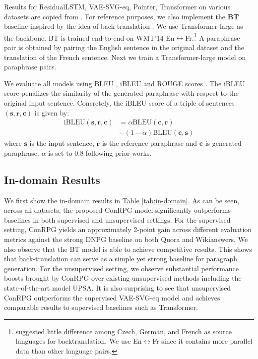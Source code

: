 \documentclass[11pt,a4paper]{article}
\newcommand{\sts}{{{\textsc{Seq2Seq}}}\xspace}
\begin{document}
Results for 
 ResidualLSTM, VAE-SVG-eq, Pointer, Transformer on various datasets are copied from . 
For reference purposes, we also implement the {\bf BT} baseline inspired by the idea of back-translation \citep{sennrich2016back-translation,wieting2017learning}. 
We use Transformer-large as the backbone. BT is trained end-to-end on WMT'14 En$\leftrightarrow$Fr.\footnote{ suggested little difference among Czech,
German, and French as source languages for backtranslation. We use En$\leftrightarrow$Fr since it contains more parallel data than other language pairs. } 
A paraphrase pair is obtained by pairing the English sentence  in the original dataset and the translation of  the French sentence. 
Next we train a Transformer-large model on paraphrase pairs. 

We evaluate all models using BLEU \citep{papineni2002bleu}, iBLEU \citep{sun2012joint} and ROUGE scores \citep{lin-2004-rouge} . The iBLEU score penalizes the similarity of the generated paraphrase with respect to the original input sentence. Concretely, the iBLEU score of a triple of sentences $(\bm{s},\bm{r},\bm{c})$ is given by:
\begin{equation}
\begin{aligned}
   \text{iBLEU}(\bm{s},\bm{r},\bm{c})&=\alpha\text{BLEU}(\bm{c},\bm{r})\\
   &-(1-\alpha)\text{BLEU}(\bm{c},\bm{s}) 
   \end{aligned}
\end{equation}
where $\bm{s}$ is the input sentence, $\bm{r}$ is the reference paraphrase and $\bm{c}$ is generated paraphrase.  $\alpha$ is set to 0.8 following prior works.

\subsection{In-domain Results}
We first show the in-domain results in Table \ref{tab:in-domain}. As can be seen, across all datasets, the proposed ConRPG model significantly outperforms baselines in both supervised and unsupervised settings. For the supervised setting, ConRPG yields an approximately   2-point gain
across different evaluation metrics 
 against the strong DNPG baseline on both Quora and Wikianswers. We also observe that the BT model 
 is able to achieve competitive results. This shows that back-translation can serve as a simple yet strong baseline for paragraph generation. For the unsupervised setting, we observe substantial performance boosts 
 brought by ConRPG  
 over existing unsupervised methods including the state-of-the-art model UPSA. It is also surprising to see that 
 unsupervised 
 ConRPG  outperforms the supervised VAE-SVG-eq model and achieves comparable results to 
  supervised baselines such as
 Transformer.
\end{document}
